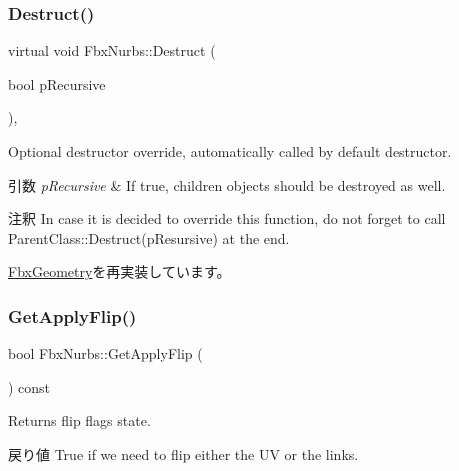 \subsubsection{\texorpdfstring{Destruct()}{Destruct()}}
{\footnotesize\ttfamily virtual void Fbx\+Nurbs\+::\+Destruct (\begin{DoxyParamCaption}\item[{bool}]{p\+Recursive }\end{DoxyParamCaption})\hspace{0.3cm}{\ttfamily [protected]}, {\ttfamily [virtual]}}

Optional destructor override, automatically called by default destructor. 
\begin{DoxyParams}{引数}
{\em p\+Recursive} & If true, children objects should be destroyed as well. \\
\hline
\end{DoxyParams}
\begin{DoxyRemark}{注釈}
In case it is decided to override this function, do not forget to call Parent\+Class\+::\+Destruct(p\+Resursive) at the end. 
\end{DoxyRemark}


\hyperlink{class_fbx_geometry_a07e94f7801067d66429afbf1799795cd}{Fbx\+Geometry}を再実装しています。

\mbox{\label{class_fbx_nurbs_a5078e2c4f27160149e19cac9c0352ceb}} 
\subsubsection{\texorpdfstring{Get\+Apply\+Flip()}{GetApplyFlip()}}
{\footnotesize\ttfamily bool Fbx\+Nurbs\+::\+Get\+Apply\+Flip (\begin{DoxyParamCaption}{ }\end{DoxyParamCaption}) const}

Returns flip flags state. \begin{DoxyReturn}{戻り値}
{\ttfamily True} if we need to flip either the UV or the links. 
\end{DoxyReturn}
\mbox{\label{class_fbx_nurbs_a7b3adc47808af1078b0d3865cc464b4a}} 

